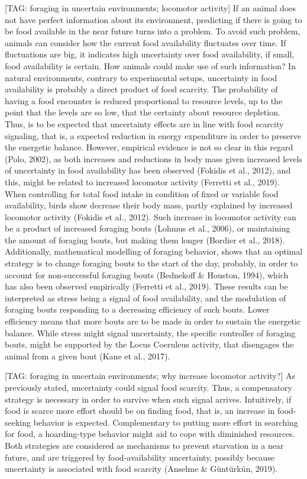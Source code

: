 \documentclass[
]{/home/nicoluarte/Downloads/templates/PNAS-template-main.tex}
\begin{document}
{[}TAG: foraging in uncertain environments; locomotor activity{]} If an
animal does not have perfect information about its environment,
predicting if there is going to be food available in the near future
turns into a problem. To avoid such problem, animals can consider how
the current food availability fluctuates over time. If fluctuations are
big, it indicates high uncertainty over food availability, if small,
food availability is certain. How animals could make use of such
information? In natural environments, contrary to experimental setups,
uncertainty in food availability is probably a direct product of food
scarcity. The probability of having a food encounter is reduced
proportional to resource levels, up to the point that the levels are so
low, that the certainty about resource depletion. Thus, is to be
expected that uncertainty effects are in line with food scarcity
signaling, that is, a expected reduction in energy expenditure in order
to preserve the energetic balance. However, empirical evidence is not so
clear in this regard (Polo, 2002), as both increases and reductions in
body mass given increased levels of uncertainty in food availability has
been observed (Fokidis et al., 2012), and this, might be related to
increased locomotor activity (Ferretti et al., 2019). When controlling
for total food intake in condition of fixed or variable food
availability, birds show decrease their body mass, partly explained by
increased locomotor activity (Fokidis et al., 2012). Such increase in
locomotor activity can be a product of increased foraging bouts (Lohmus
et al., 2006), or maintaining the amount of foraging bouts, but making
them longer (Bordier et al., 2018). Additionally, mathematical modelling
of foraging behavior, shows that an optimal strategy is to change
foraging bouts to the start of the day, probably, in order to account
for non-successful foraging bouts (Bednekoff \& Houston, 1994), which
has also been observed empirically (Ferretti et al., 2019). These
results can be interpreted as stress being a signal of food
availability, and the modulation of foraging bouts responding to a
decreasing efficiency of such bouts. Lower efficiency means that more
bouts are to be made in order to sustain the energetic balance. While
stress might signal uncertainty, the specific controller of foraging
bouts, might be supported by the Locus Coeruleus activity, that
disengages the animal from a given bout (Kane et al., 2017).

{[}TAG: foraging in uncertain environments; why increase locomotor
activity?{]} As previously stated, uncertainty could signal food
scarcity. Thus, a compensatory strategy is necessary in order to survive
when such signal arrives. Intuitively, if food is scarce more effort
should be on finding food, that is, an increase in food-seeking behavior
is expected. Complementary to putting more effort in searching for food,
a hoarding-type behavior might aid to cope with diminished resources.
Both strategies are considered as mechanisms to prevent starvation in a
near future, and are triggered by food-availability uncertainty,
possibly because uncertainty is associated with food scarcity (Anselme
\& Güntürkün, 2019).
\end{document}
